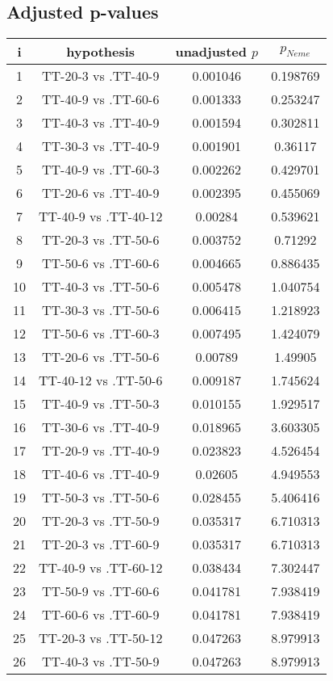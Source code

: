 \documentclass[a4paper,10pt]{article}
\begin{document}
\begin{landscape}
\pagebreak

\subsection{Adjusted p-values}

\begin{table}[!htp]
\centering\scriptsize
\begin{tabular}{cccc}
i&hypothesis&unadjusted $p$&$p_{Neme}$\\
\hline1&TT-20-3 vs .TT-40-9&0.001046&0.198769\\
2&TT-40-9 vs .TT-60-6&0.001333&0.253247\\
3&TT-40-3 vs .TT-40-9&0.001594&0.302811\\
4&TT-30-3 vs .TT-40-9&0.001901&0.36117\\
5&TT-40-9 vs .TT-60-3&0.002262&0.429701\\
6&TT-20-6 vs .TT-40-9&0.002395&0.455069\\
7&TT-40-9 vs .TT-40-12&0.00284&0.539621\\
8&TT-20-3 vs .TT-50-6&0.003752&0.71292\\
9&TT-50-6 vs .TT-60-6&0.004665&0.886435\\
10&TT-40-3 vs .TT-50-6&0.005478&1.040754\\
11&TT-30-3 vs .TT-50-6&0.006415&1.218923\\
12&TT-50-6 vs .TT-60-3&0.007495&1.424079\\
13&TT-20-6 vs .TT-50-6&0.00789&1.49905\\
14&TT-40-12 vs .TT-50-6&0.009187&1.745624\\
15&TT-40-9 vs .TT-50-3&0.010155&1.929517\\
16&TT-30-6 vs .TT-40-9&0.018965&3.603305\\
17&TT-20-9 vs .TT-40-9&0.023823&4.526454\\
18&TT-40-6 vs .TT-40-9&0.02605&4.949553\\
19&TT-50-3 vs .TT-50-6&0.028455&5.406416\\
20&TT-20-3 vs .TT-50-9&0.035317&6.710313\\
21&TT-20-3 vs .TT-60-9&0.035317&6.710313\\
22&TT-40-9 vs .TT-60-12&0.038434&7.302447\\
23&TT-50-9 vs .TT-60-6&0.041781&7.938419\\
24&TT-60-6 vs .TT-60-9&0.041781&7.938419\\
25&TT-20-3 vs .TT-50-12&0.047263&8.979913\\
26&TT-40-3 vs .TT-50-9&0.047263&8.979913\\

\end{tabular}
\end{table}
\end{landscape}
\end{document}
